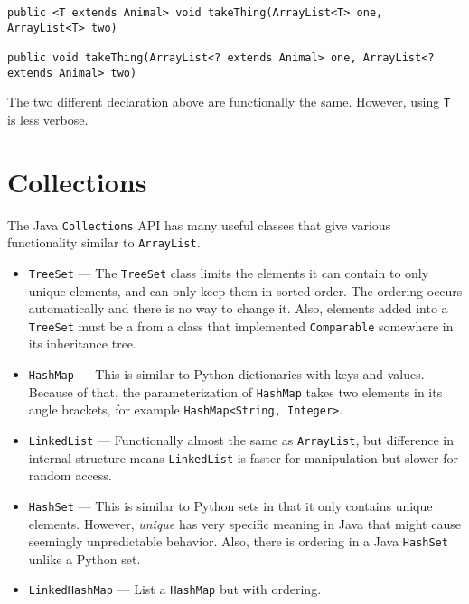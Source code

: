 \documentclass{tufte-handout}
\begin{document}
    \begin{lstlisting}
public <T extends Animal> void takeThing(ArrayList<T> one, ArrayList<T> two)

public void takeThing(ArrayList<? extends Animal> one, ArrayList<? extends Animal> two)
    \end{lstlisting}

    The two different declaration above are functionally the same. However, using \texttt{T} is less verbose. 

    \section*{Collections}

    The Java \texttt{Collections} API has many useful classes that give various functionality similar to \texttt{ArrayList}. 

    \begin{itemize}
        \item \texttt{TreeSet} --- The \texttt{TreeSet} class limits the elements it can contain to only unique elements, and can only keep them in sorted order. The ordering occurs automatically and there is no way to change it. Also, elements added into a \texttt{TreeSet} must be a from a class that implemented \texttt{Comparable} somewhere in its inheritance tree.
        \item \texttt{HashMap} --- This is similar to Python dictionaries with keys and values. Because of that, the parameterization of \texttt{HashMap} takes two elements in its angle brackets, for example \texttt{HashMap<String, Integer>}.
        \item \texttt{LinkedList} --- Functionally almost the same as \texttt{ArrayList}, but difference in internal structure means \texttt{LinkedList} is faster for manipulation but slower for random access.
        \item \texttt{HashSet} --- This is similar to Python sets in that it only contains unique elements. However, \emph{unique} has very specific meaning in Java that might cause seemingly unpredictable behavior. Also, there is ordering in a Java \texttt{HashSet} unlike a Python set.
        \item \texttt{LinkedHashMap} --- List a \texttt{HashMap} but with ordering.
    \end{itemize}
\end{document}
